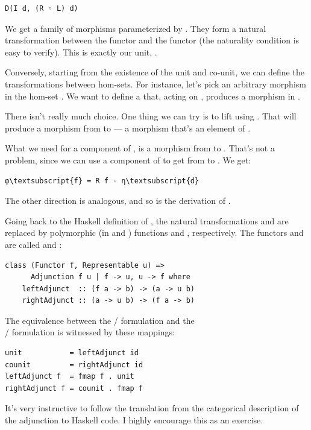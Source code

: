 \begin{Verbatim}[commandchars=\\\{\}]
D(I d, (R ◦ L) d)
\end{Verbatim}
We get a family of morphisms parameterized by . They form a
natural transformation between the functor  and the functor
 (the naturality condition is easy to verify). This is
exactly our unit, .

Conversely, starting from the existence of the unit and co-unit, we can
define the transformations between hom-sets. For instance, let's pick an
arbitrary morphism  in the hom-set . We
want to define a  that, acting on , produces a
morphism in .

There isn't really much choice. One thing we can try is to lift
 using . That will produce a morphism 
from  to  --- a morphism that's an
element of .

What we need for a component of , is a morphism from
 to . That's not a problem, since we can use a
component of  to get from  to
. We get:

\begin{Verbatim}[commandchars=\\\{\}]
φ\textsubscript{f} = R f ◦ η\textsubscript{d}
\end{Verbatim}
The other direction is analogous, and so is the derivation of
.

Going back to the Haskell definition of , the natural
transformations  and  are replaced by polymorphic
(in  and ) functions  and
, respectively. The functors  and
 are called  and :

\begin{Verbatim}[commandchars=\\\{\}]
class (Functor f, Representable u) => 
      Adjunction f u | f -> u, u -> f where
    leftAdjunct  :: (f a -> b) -> (a -> u b)
    rightAdjunct :: (a -> u b) -> (f a -> b) 
\end{Verbatim}
The equivalence between the / formulation
and the\\ / formulation is
witnessed by these mappings:

\begin{Verbatim}[commandchars=\\\{\}]
unit           = leftAdjunct id
counit         = rightAdjunct id
leftAdjunct f  = fmap f . unit
rightAdjunct f = counit . fmap f 
\end{Verbatim}
It's very instructive to follow the translation from the categorical
description of the adjunction to Haskell code. I highly encourage this
as an exercise.


